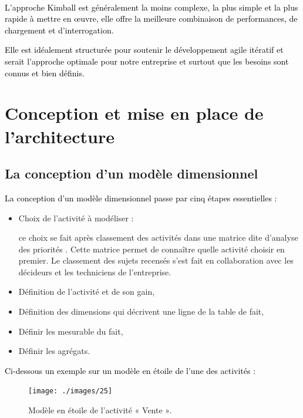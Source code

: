 \documentclass[a4paper,12pt]{report}
\begin{document}
~\

\textcolor{black}{L'approche Kimball est généralement la moins complexe, la plus simple et la plus rapide à mettre en œuvre, elle offre la meilleure combinaison de performances, de chargement et d'interrogation.}

\textcolor{black}{Elle est idéalement structurée pour soutenir le développement agile itératif et serait l'approche optimale pour notre entreprise et surtout que les besoins sont connus et bien définis.}



\section{Conception et mise en place de l’architecture }
\subsection{La conception d’un modèle dimensionnel  }
\textcolor{black}{La conception d’un modèle dimensionnel passe par cinq étapes essentielles :}

\begin{itemize}

	\item  \begin{bf}Choix de l’activité à modéliser : \end{bf} ce choix se fait après classement des activités dans une matrice dite d’analyse des priorités \citep{kimball2004data}. Cette matrice permet de connaître quelle activité choisir en premier. Le classement des sujets recensés s’est fait en collaboration avec les décideurs et les techniciens de l’entreprise.
	\item  Définition de l’activité et de son gain,
	\item  Définition des dimensions qui décrivent une ligne de la table de fait,
	\item  Définir les mesurable du fait,
	\item  Définir les agrégats.
\end{itemize}

\textcolor{black}{Ci-dessous un exemple sur un modèle en étoile de l’une des activités :}

\begin{figure}[H]

\begin{center}
\texttt{[image: ./images/25]}
\end{center}

\caption{Modèle en étoile de l’activité « Vente ».}
\label{fig:1}

\end{figure}
\end{document}
